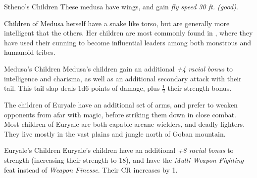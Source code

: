 \begin{35e}{Stheno's Children}
  These medusa have wings, and gain \emph{fly speed 30 ft. (good)}.
\end{35e}

Children of Medusa herself have a snake like torso, but are generally more
intelligent that the others. Her children are most commonly found in
, where they have used their cunning to become
influential leaders among both monstrous and humanoid tribes.

\begin{35e}{Medusa's Children}
  Medusa's children gain an additional \emph{+4 racial bonus} to intelligence
  and charisma, as well as an additional secondary attack with their tail.
  This tail slap deals 1d6 points of damage, plus $ \frac{1}{2} $ their strength
  bonus.
\end{35e}

The children of Euryale have an additional set of arms, and prefer to weaken
opponents from afar with magic, before striking them down in close combat.
Most children of Euryale are both capable arcane wielders, and deadly
fighters. They live mostly in the vast plains and jungle north of Goban
mountain.

\begin{35e}{Euryale's Children}
  Euryale's children have an additional \emph{+8 racial bonus} to strength
  (increasing their strength to 18), and have the \emph{Multi-Weapon Fighting}
  feat instead of \emph{Weapon Finesse}. Their CR increases by 1.
\end{35e}
